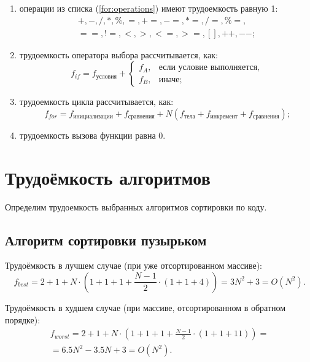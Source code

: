 \begin{enumerate}
	\item операции из списка (\ref{for:operations}) имеют трудоемкость равную 1:
	\begin{equation}
		\label{for:operations}
		\begin{gathered}
			+, -, /, *, \%, =, +=, -=, *=, /=, \%=, \\
			==, !=, <, >, <=, >=, [], ++, {-}-;
		\end{gathered}
	\end{equation}
	\item трудоемкость оператора выбора  рассчитывается, как:
	\begin{equation}
		\label{for:if}
		f_{if} = f_{\text{условия}} +
		\begin{cases}
			f_A, & \text{если условие выполняется,}\\
			f_B, & \text{иначе;}
		\end{cases}
	\end{equation}
	\item трудоемкость цикла рассчитывается, как:
	\begin{equation}
		\label{for:cycle}
		f_{for} = f_{\text{инициализации}} + f_{\text{сравнения}} + N(f_{\text{тела}} + f_{\text{инкремент}} + f_{\text{сравнения}})\text{;}
	\end{equation}
	\item трудоемкость вызова функции равна 0.
\end{enumerate}


\section{Трудоёмкость алгоритмов}

Определим трудоемкость выбранных алгоритмов сортировки по коду.

\subsection{Алгоритм сортировки пузырьком}

Трудоёмкость в лучшем случае (при уже отсортированном массиве):
\begin{equation}
	\label{for:bubble_best}
    f_{best} = 2 + 1 + N \cdot (1 + 1 + 1 + \frac{N - 1}{2} \cdot (1 + 1 + 4)) = 3N^2 + 3 = O(N^2).
\end{equation}

Трудоёмкость в худшем случае (при массиве, отсортированном в обратном порядке):
\begin{equation}
	\label{for:bubble_worst}
	\begin{gathered}
    	f_{worst} = 2 + 1 + N \cdot (1 + 1 + 1 + \frac{N - 1}{2} \cdot (1 + 1 + 11)) = \\
		= 6.5N^2 - 3.5N + 3 = O(N^2).
	\end{gathered}
\end{equation}

